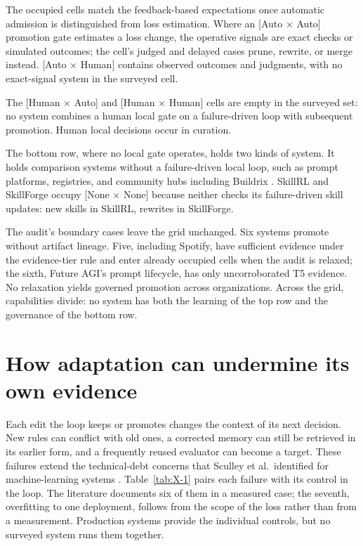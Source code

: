 \documentclass[
  11pt,
]{article}
\begin{document}
The occupied cells match the feedback-based expectations once automatic admission is distinguished from loss estimation. Where an {[}Auto × Auto{]} promotion gate estimates a loss change, the operative signals are exact checks or simulated outcomes; the cell's judged and delayed cases prune, rewrite, or merge instead. {[}Auto × Human{]} contains observed outcomes and judgments, with no exact-signal system in the surveyed cell.

The {[}Human × Auto{]} and {[}Human × Human{]} cells are empty in the surveyed set: no system combines a human local gate on a failure-driven loop with subsequent promotion. Human local decisions occur in curation.

The bottom row, where no local gate operates, holds two kinds of system. It holds comparison systems without a failure-driven local loop, such as prompt platforms, registries, and community hubs including Buildrix \cite{jiang2026buildrix}. SkillRL and SkillForge occupy {[}None × None{]} because neither checks its failure-driven skill updates: new skills in SkillRL, rewrites in SkillForge.

The audit's boundary cases leave the grid unchanged. Six systems promote without artifact lineage. Five, including Spotify, have sufficient evidence under the evidence-tier rule and enter already occupied cells when the audit is relaxed; the sixth, Future AGI's prompt lifecycle, has only uncorroborated T5 evidence. No relaxation yields governed promotion across organizations. Across the grid, capabilities divide: no system has both the learning of the top row and the governance of the bottom row.

\section{How adaptation can undermine its own evidence}\label{sec:failure}

Each edit the loop keeps or promotes changes the context of its next decision. New rules can conflict with old ones, a corrected memory can still be retrieved in its earlier form, and a frequently reused evaluator can become a target. These failures extend the technical-debt concerns that Sculley et al.~identified for machine-learning systems \cite{sculley2015debt}. Table~\ref{tab:X-1} pairs each failure with its control in the loop. The literature documents six of them in a measured case; the seventh, overfitting to one deployment, follows from the scope of the loss rather than from a measurement. Production systems provide the individual controls, but no surveyed system runs them together.
\end{document}
